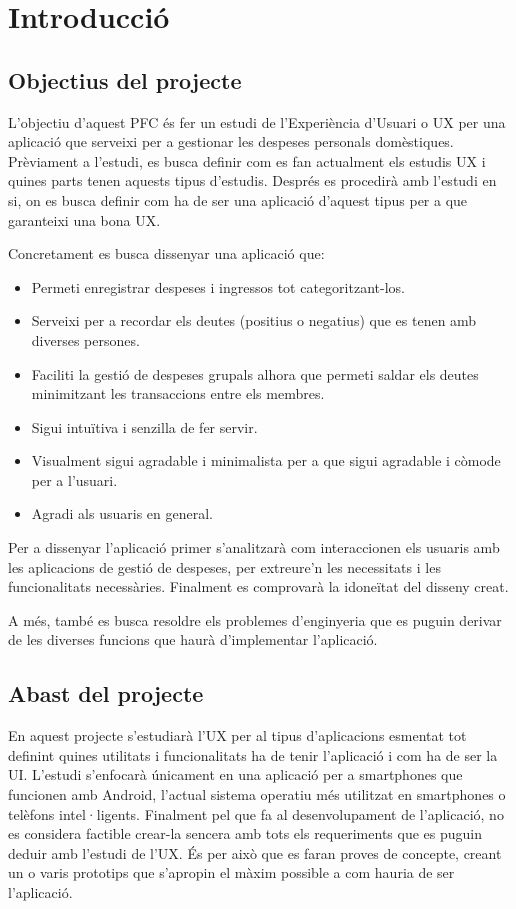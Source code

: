 \chapter{Introducció}

\section{Objectius del projecte}\label{objectius}
L'objectiu d'aquest \ac{PFC} és fer un estudi de l'Experiència d'Usuari o \ac{UX} per una aplicació que serveixi per a gestionar les despeses personals domèstiques. Prèviament a l'estudi, es busca definir com es fan actualment els estudis \ac{UX} i quines parts tenen aquests tipus d'estudis. Després es procedirà amb l'estudi en si, on es busca definir com ha de ser una aplicació d'aquest tipus per a que garanteixi una bona \ac{UX}.

Concretament es busca dissenyar una aplicació que:
\begin{itemize}
\item Permeti enregistrar despeses i ingressos tot categoritzant-los.
\item Serveixi per a recordar els deutes (positius o negatius) que es tenen amb diverses persones.
\item Faciliti la gestió de despeses grupals alhora que permeti saldar els deutes minimitzant les transaccions entre els membres.
\item Sigui intuïtiva i senzilla de fer servir.
\item Visualment sigui agradable i minimalista per a que sigui agradable i còmode per a l'usuari.
\item Agradi als usuaris en general.
\end{itemize}

Per a dissenyar l'aplicació primer s'analitzarà com interaccionen els usuaris amb les aplicacions de gestió de despeses, per extreure'n les necessitats i les funcionalitats necessàries. Finalment es comprovarà la idoneïtat del disseny creat.

A més, també es busca resoldre els problemes d'enginyeria que es puguin derivar de les diverses funcions que haurà d'implementar l'aplicació. 

\section{Abast del projecte}
En aquest projecte s'estudiarà l'\ac{UX} per al tipus d'aplicacions esmentat tot definint quines utilitats i funcionalitats ha de tenir l'aplicació i com ha de ser la \ac{UI}. L'estudi s'enfocarà únicament en una aplicació per a \glspl{smartphone} que funcionen amb \gls{Android}, l'actual sistema operatiu més utilitzat\cite{Android_OS} en \glspl{smartphone} o telèfons intel·ligents. 
Finalment pel que fa al desenvolupament de l'aplicació, no es considera factible crear-la sencera amb tots els requeriments que es puguin deduir amb l'estudi de l'\ac{UX}. És per això que es faran proves de concepte, creant un o varis prototips que s'apropin el màxim possible a com hauria de ser l'aplicació. 